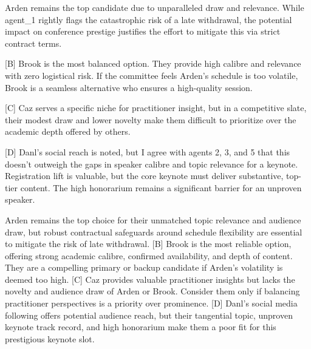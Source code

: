 \documentclass{article}
\begin{document}
\begin{tcolorbox}[mbox-neutral={agent\_4 -- discussion r2}]
[A] Arden remains the top candidate due to unparalleled draw and relevance. While agent\_1 rightly flags the catastrophic risk of a late withdrawal, the potential impact on conference prestige justifies the effort to mitigate this via strict contract terms.

[B] Brook is the most balanced option. They provide high calibre and relevance with zero logistical risk. If the committee feels Arden's schedule is too volatile, Brook is a seamless alternative who ensures a high-quality session.

[C] Caz serves a specific niche for practitioner insight, but in a competitive slate, their modest draw and lower novelty make them difficult to prioritize over the academic depth offered by others.

[D] Danl's social reach is noted, but I agree with agents 2, 3, and 5 that this doesn't outweigh the gaps in speaker calibre and topic relevance for a keynote. Registration lift is valuable, but the core keynote must deliver substantive, top-tier content. The high honorarium remains a significant barrier for an unproven speaker.
\end{tcolorbox}

\begin{tcolorbox}[mbox-neutral={agent\_5 -- discussion r2}]
[A] Arden remains the top choice for their unmatched topic relevance and audience draw, but robust contractual safeguards around schedule flexibility are essential to mitigate the risk of late withdrawal.  
[B] Brook is the most reliable option, offering strong academic calibre, confirmed availability, and depth of content. They are a compelling primary or backup candidate if Arden's volatility is deemed too high.  
[C] Caz provides valuable practitioner insights but lacks the novelty and audience draw of Arden or Brook. Consider them only if balancing practitioner perspectives is a priority over prominence.  
[D] Danl's social media following offers potential audience reach, but their tangential topic, unproven keynote track record, and high honorarium make them a poor fit for this prestigious keynote slot.
\end{tcolorbox}
\end{document}
